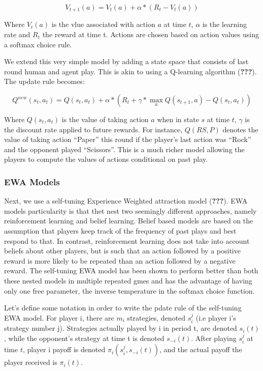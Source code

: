 \documentclass[man,floatsintext]{apa6}
\begin{document}
\[ V_{t+1}(a) = V_{t}(a) + \alpha*( R_{t}  - V_{t}(a)) \]

Where \(V_{t}(a)\) is the vlue associated with action \(a\) at time \(t\), \(\alpha\) is the learning rate and \(R_{t}\) the reward at time t. Actions are chosen based on action values using a softmax choice rule.

We extend this very simple model by adding a state space that consists of last round human and agent play. This is akin to using a Q-learning algorithm ({\textbf{???}}). The update rule becomes:

\[ Q^{new}(s_{t},a_{t}) = Q(s_{t},a_{t}) + \alpha*( R_{t}  + \gamma*\underset{a}{\max}Q(s_{t+1},a) - Q(s_{t},a_{t}) ) \]

Where \(Q(s_{t},a_{t})\) is the value of taking action \(a\) when in state \(s\) at time \(t\), \(\gamma\) is the discount rate applied to future rewards. For instance, \(Q(RS,P)\) denotes the value of taking action ``Paper'' this round if the player's last action was ``Rock'' and the opponent played ``Scissors''. This is a much richer model allowing the players to compute the values of actions conditional on past play.

\hypertarget{ewa-models}{%
\subsubsection{EWA Models}\label{ewa-models}}

Next, we use a self-tuning Experience Weighted attraction model ({\textbf{???}}). EWA models particularity is that thet nest two seemingly different approaches, namely reinforcement learning and belief learning. Belief based models are based on the assumption that players keep track of the frequency of past plays and best respond to that. In contrast, reinforcement learning does not take into account beliefs about other players, but is such that an action followed by a positive reward is more likely to be repeated than an action followed by a negative reward. The self-tuning EWA model has been shown to perform better than both these nested models in multiple repeated gmes and has the advantage of having only one free parameter, the inverse temperature in the softmax choice function.

Let's define some notation in order to write the pdate rule of the self-tuning EWA model. For player i, there are \(m_{i}\) strategies, denoted \(s_{i}^{j}\) (i.e player i's strategy number j). Strategies actually played by i in period t, are denoted \(s_{i}(t)\), while the opponent's strategy at time t is denoted \(s_{-i}(t)\). After playing \(s_{i}^{j}\) at time \(t\), player i payoff is denoted \(\pi_{i}(s_{i}^{j},s_{-i}(t))\), and the actual payoff the player received is \(\pi_{i}(t)\).
\end{document}
